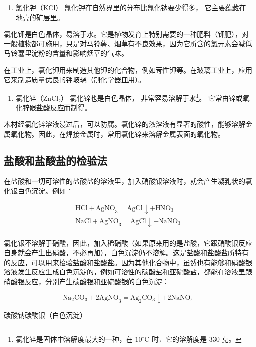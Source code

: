 \begin{enumerate}[start=2]
\item
  氯化钾（KCl） 氯化钾在自然界里的分布比氯化钠要少得多，
  它主要蕴藏在地壳的矿层里。
\end{enumerate}

氯化钾是白色晶体，易溶于水。它是植物发育上特别需要的一种肥料（钾肥），对一般植物都可施用，只是对马铃薯、烟草有不良效果，因为它所含的氯元素会减低马铃薯里淀粉的含量和影响烟草的气味。

在工业上，氯化钾用来制造其他钾的化合物，例如苛性钾等。在玻璃工业上，应用它来制造质量优良的钾玻璃（制化学器皿用）。

\begin{enumerate}[start=3]
\item
  氯化锌（ZnCl₂） 氯化锌也是白色晶体， 非常容易溶解于水\footnote{氯化锌是固体中溶解度最大的一种，在
    \(10^{\circ} \mathrm{C}\) 时，它的溶解度是 330 克。}。
  它常由锌或氧化锌跟盐酸反应而制得。
\end{enumerate}

木材经氯化锌溶液浸过后，可以防腐。氯化锌的浓溶液有显著的酸性，能够溶解金属氧化物。因此，在焊接金属时，常用氯化锌来溶解金属表面的氧化物。

\subsection{盐酸和盐酸盐的检验法}

在盐酸和一切可溶性的盐酸盐的溶液里，加入硝酸银溶液时，就会产生凝乳状的氯化银白色沉淀。例如：

\[
\begin{array}{l} \mathrm{HCl} + \mathrm{AgNO} _ {3} = \mathrm{AgCl} \downarrow + \mathrm{HNO} _ {3} \\ \mathrm{NaCl} + \mathrm{AgNO} _ {3} = \mathrm{AgCl} \downarrow + \mathrm{NaNO} _ {3} \\ \end{array}
\]

氯化银不溶解于硝酸，因此，加入稀硝酸（如果原来用的是盐酸，它跟硝酸银反应自身就会产生出硝酸，不必再加），白色沉淀仍不溶解。这是盐酸和盐酸盐所特有的反应，可以用来检验盐酸和盐酸盐。因为其他化合物中，虽然也有能够和硝酸银溶液发生反应生成白色沉淀的，例如可溶性的碳酸盐和亚硫酸盐，都能在溶液里跟硝酸银反应，分别产生碳酸银和亚硫酸银的白色沉淀：

\[
\mathrm{Na} _ {2} \mathrm{CO} _ {3} + 2 \mathrm{AgNO} _ {3} = \mathrm{Ag} _ {2} \mathrm{CO} _ {3} \downarrow + 2 \mathrm{NaNO} _ {3}
\]

碳酸钠碳酸银（白色沉淀）

